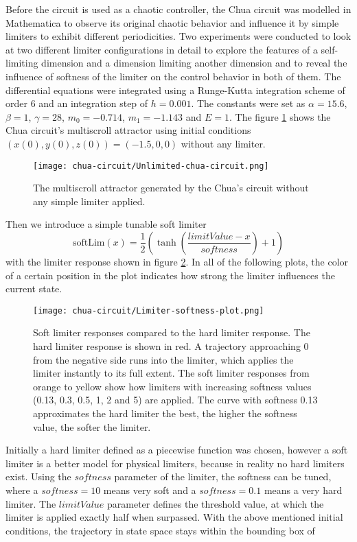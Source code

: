 \documentclass[main]{subfiles}
\begin{document}
Before the circuit is used as a chaotic controller, the Chua circuit was modelled in Mathematica to observe its original chaotic behavior and influence it by simple limiters to exhibit different periodicities. Two experiments were conducted to look at two different limiter configurations in detail to explore the features of a self-limiting dimension and a dimension limiting another dimension and to reveal the influence of softness of the limiter on the control behavior in both of them. The differential equations were integrated using a Runge-Kutta integration scheme of order 6 and an integration step of \(h=0.001\). The constants were set as \(\alpha = 15.6\), \(\beta = 1\), \(\gamma = 28\), \(m_0 = -0.714\), \(m_1 = -1.143\) and \(E = 1\). The figure \ref{figure:chaoticchuacircuit} shows the Chua circuit's multiscroll attractor using initial conditions \((x(0),y(0),z(0)) = (-1.5,0,0)\) without any limiter.

\begin{figure}[H]
\centering
\texttt{[image: chua-circuit/Unlimited-chua-circuit.png]}
\caption[The multiscroll attractor]{The multiscroll attractor generated by the Chua's circuit without any simple limiter applied.}
\label{figure:chaoticchuacircuit}
\end{figure}

Then we introduce a simple tunable soft limiter \[\text{softLim}(x) = \frac{1}{2} \left(\tanh\left(\frac{limitValue - x}{softness}\right) + 1\right)\] with the limiter response shown in figure \ref{figure:softlimiterresponse}. In all of the following plots, the color of a certain position in the plot indicates how strong the limiter influences the current state.

\begin{figure}[H]
\centering
\texttt{[image: chua-circuit/Limiter-softness-plot.png]}
\caption[Soft limiter responses]{Soft limiter responses compared to the hard limiter response. The hard limiter response is shown in red. A trajectory approaching 0 from the negative side runs into the limiter, which applies the limiter instantly to its full extent. The soft limiter responses from orange to yellow show how limiters with increasing softness values (0.13, 0.3, 0.5, 1, 2 and 5) are applied. The curve with softness 0.13 approximates the hard limiter the best, the higher the softness value, the softer the limiter.}
\label{figure:softlimiterresponse}
\end{figure}

Initially a hard limiter defined as a piecewise function was chosen, however a soft limiter is a better model for physical limiters, because in reality no hard limiters exist. Using the $softness$ parameter of the limiter, the softness can be tuned, where a \(softness = 10\) means very soft and a \(softness = 0.1\) means a very hard limiter. The $limitValue$ parameter defines the threshold value, at which the limiter is applied exactly half when surpassed. With the above mentioned initial conditions, the trajectory in state space stays within the bounding box of 
\end{document}
